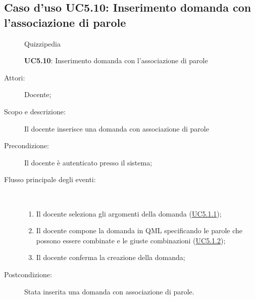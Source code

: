 \subsection{Caso d'uso UC5.10: Inserimento domanda con l'associazione di parole}
	\begin{figure}[H]
		\centering
		\begin{resizedtikzpicture}{\textwidth}
		\begin{umlsystem}[x=0, fill=lightgray!20]{Quizzipedia}
		\end{umlsystem}
		\end{resizedtikzpicture}
		\caption{\textbf{UC5.10}: Inserimento domanda con l'associazione di parole}
		\label{UC5.10}
	\end{figure}
\begin{description}
\item[Attori:] Docente;
\item[Scopo e descrizione:] Il docente inserisce una domanda con associazione di parole
      \item[Precondizione:] Il docente è autenticato presso il sistema;

        \item[Flusso principale degli eventi:] \ 
 \begin{enumerate}
          \item Il docente seleziona gli argomenti della domanda (\hyperlink{UC5.1.1}{UC5.1.1});
          \item Il docente compone la domanda in QML specificando le parole che possono essere combinate e le giuste combinazioni (\hyperlink{UC5.1.2}{UC5.1.2});
          \item Il docente conferma la creazione della domanda;

      \end{enumerate}
    \item[Postcondizione:] Stata inserita una domanda con associazione di parole.
  \end{description}
\hypertarget{UC5.11}{}
